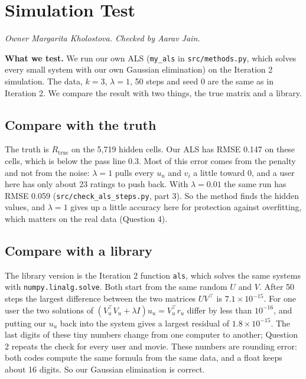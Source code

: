 \section{Simulation Test}
\textit{Owner Margarita Kholostova. Checked by Aarav Jain.}


\textbf{What we test.} We run our own ALS (\texttt{my\_als} in \texttt{src/methods.py}, which solves every small system with our own Gaussian elimination) on the Iteration 2 simulation. The data, $k = 3$, $\lambda = 1$, 50 steps and seed 0 are the same as in Iteration 2. We compare the result with two things, the true matrix and a library.

\subsection{Compare with the truth}

The truth is $R_{\text{true}}$ on the 5{,}719 hidden cells. Our ALS has RMSE 0.147 on these cells, which is below the pass line 0.3. Most of this error comes from the penalty and not from the noise: $\lambda = 1$ pulls every $u_u$ and $v_i$ a little toward 0, and a user here has only about 23 ratings to push back. With $\lambda = 0.01$ the same run has RMSE 0.059 (\texttt{src/check\_als\_steps.py}, part 3). So the method finds the hidden values, and $\lambda = 1$ gives up a little accuracy here for protection against overfitting, which matters on the real data (Question 4).

\subsection{Compare with a library}

The library version is the Iteration 2 function \texttt{als}, which solves the same systems with \texttt{numpy.linalg.solve}. Both start from the same random $U$ and $V$. After 50 steps the largest difference between the two matrices $UV^\top$ is $7.1\times10^{-15}$. For one user the two solutions of $(V_u^\top V_u + \lambda I)u_u = V_u^\top r_u$ differ by less than $10^{-16}$, and putting our $u_u$ back into the system gives a largest residual of $1.8\times10^{-15}$. The last digits of these tiny numbers change from one computer to another; Question 2 repeats the check for every user and movie. These numbers are rounding error: both codes compute the same formula from the same data, and a float keeps about 16 digits. So our Gaussian elimination is correct.


